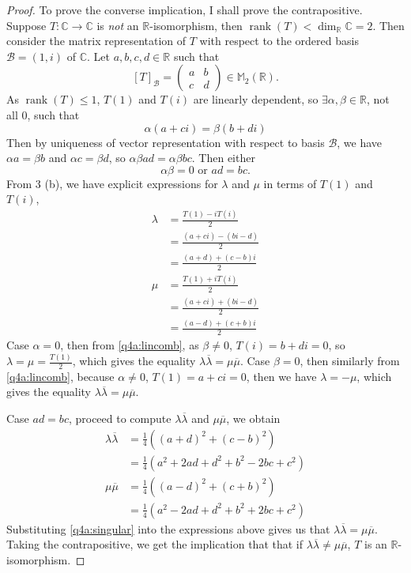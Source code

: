 \documentclass{article}
\theoremstyle{definition}
\numberwithin{lemma}{problem}
\numberwithin{equation}{problem}
\newcommand{\R}{\mathbb{R}}
\newcommand{\C}{\mathbb{C}}
\newcommand{\M}{\mathbb{M}}
\newcommand{\B}{\mathcal{B}}
\newcommand{\conj}[1]{\overline{#1}}
\DeclareMathOperator{\rank}{rank}
\renewcommand{\leq}{\leqslant}
\begin{document}
\begin{proof}
    To prove the converse implication, I shall prove the contrapositive.
    Suppose $T: \C \to \C$ is \emph{not} an $\R$-isomorphism, then $\rank(T) < \dim_\R \C = 2$.
    Then consider the matrix representation of $T$ with respect to the ordered basis $\B = (1,i)$ of $\C$.
    Let $a,b,c,d\in \R$ such that
    $$ [T]_\B = \begin{pmatrix} a & b \\ c & d \end{pmatrix} \in \M_2(\R). $$
    As $\rank(T) \leq 1$, $T(1)$ and $T(i)$ are linearly dependent,
    so $\exists \alpha,\beta \in \R$, not all $0$, such that
    \begin{equation}    \label{q4a:lincomb}
        \alpha(a + ci) = \beta(b + di)
    \end{equation}
    Then by uniqueness of vector representation with respect to basis $\B$,
    we have $\alpha a = \beta b$ and $\alpha c = \beta d$, so
    $ \alpha\beta a d = \alpha\beta b c. $ Then either
    \begin{equation}    \label{q4a:singular}
        \alpha\beta = 0 \text{ or } ad = bc.
    \end{equation}
    From 3 (b), we have explicit expressions for $\lambda$ and $\mu$ in terms of $T(1)$ and $T(i)$,
    \begin{align*}
        \lambda &= \frac{T(1) - iT(i)}{2}\\
        &= \frac{(a + ci) - (bi - d)}{2}\\
        &= \frac{(a + d) + (c - b)i}{2}\\
        \mu &= \frac{T(1) + iT(i)}{2}\\
        &= \frac{(a + ci) + (bi - d)}{2}\\
        &= \frac{(a - d) + (c + b)i}{2}
    \end{align*}
    Case $\alpha = 0$, then from \eqref{q4a:lincomb},
    as $\beta \ne 0$, $T(i) = b + di = 0$,
    so $\lambda = \mu = \frac{T(1)}{2}$,
    which gives the equality $\lambda\conj\lambda = \mu\conj\mu$.
    Case $\beta = 0$, then similarly from \eqref{q4a:lincomb},
    because $\alpha \ne 0$, $T(1) = a + ci = 0$,
    then we have $\lambda = -\mu$, which gives the equality $\lambda\conj\lambda = \mu\conj\mu$.

    Case $ad = bc$, proceed to compute $\lambda\conj\lambda$ and $\mu\conj\mu$, we obtain
    \begin{align*}
        \lambda\conj\lambda &= \frac{1}{4} \left( (a+d)^2 + (c-b)^2 \right)\\
        &= \frac{1}{4} \left( a^2 + 2ad + d^2 + b^2 - 2bc + c^2 \right)\\
        \mu\conj\mu &= \frac{1}{4} \left( (a-d)^2 + (c+b)^2 \right)\\
        &= \frac{1}{4} \left( a^2 - 2ad + d^2 + b^2 + 2bc + c^2 \right)
    \end{align*}
    Substituting \eqref{q4a:singular} into the expressions above gives us that $\lambda\conj\lambda = \mu\conj\mu$.
    Taking the contrapositive, we get the implication that that if $\lambda\conj\lambda \ne \mu\conj\mu$, $T$ is an $\R$-isomorphism.
\end{proof}
\end{document}
